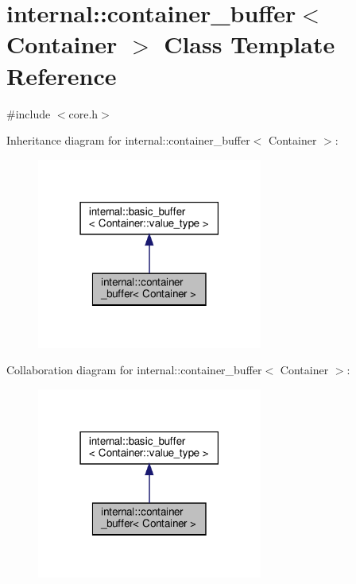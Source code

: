 \hypertarget{classinternal_1_1container__buffer}{}\section{internal\+:\+:container\+\_\+buffer$<$ Container $>$ Class Template Reference}
\label{classinternal_1_1container__buffer}


{\ttfamily \#include $<$core.\+h$>$}



Inheritance diagram for internal\+:\+:container\+\_\+buffer$<$ Container $>$\+:
\nopagebreak
\begin{figure}[H]
\begin{center}
\leavevmode
\includegraphics[width=210pt]{classinternal_1_1container__buffer__inherit__graph}
\end{center}
\end{figure}


Collaboration diagram for internal\+:\+:container\+\_\+buffer$<$ Container $>$\+:
\nopagebreak
\begin{figure}[H]
\begin{center}
\leavevmode
\includegraphics[width=210pt]{classinternal_1_1container__buffer__coll__graph}
\end{center}
\end{figure}

